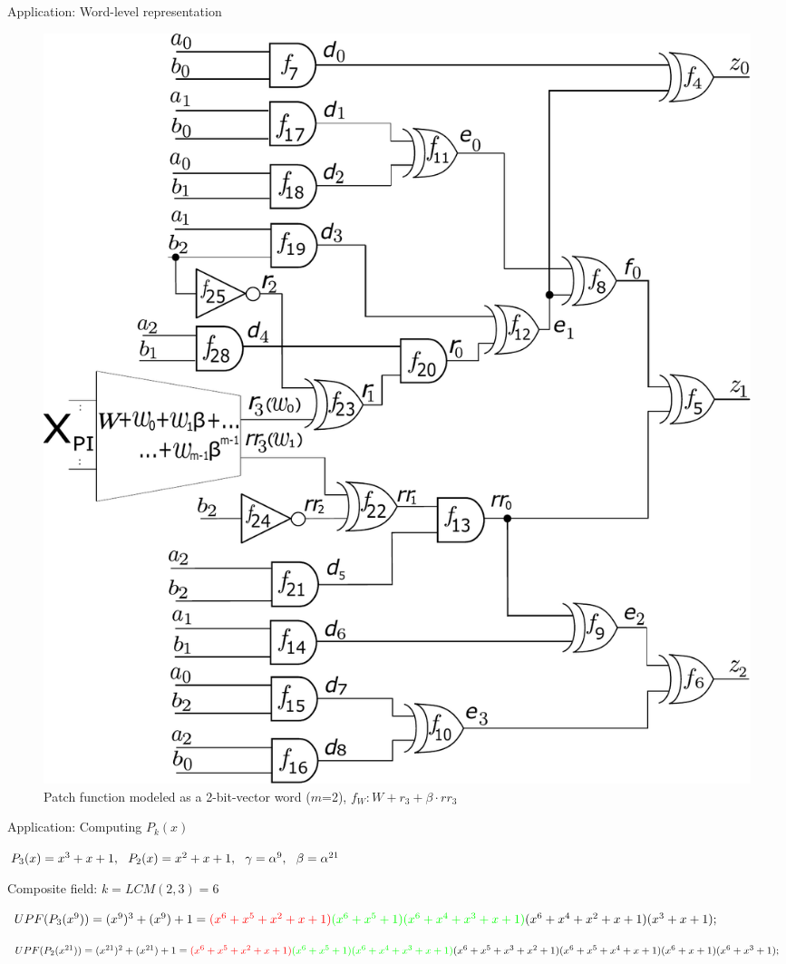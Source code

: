 \begin{frame}{\large Application: Word-level representation}
\begin{figure}[hbt]
\centering
    \includegraphics[scale = 0.24]{mas_3_ddc_mfr_b.pdf}
    \caption*{
    Patch function modeled as a 2-bit-vector word ($m$=2), 
    $f_W: W+ r_3 + \beta \cdot rr_3$}
\end{figure}
\end{frame}

\begin{frame}{\large Application: Computing $P_k(x)$}
\bi
\item $P_3(x) = x^3+x+1,~~P_2(x) = x^2+x+1,~~\gamma = \alpha^9,~~\beta=\alpha^{21}$
\pause
\vspace{0.1in}
	\item Composite field: $k=LCM(2,3)=6$
	\vspace{0.1in}
	\pause
	\bi
		\item $ UPF(P_3(x^9)) = (x^9)^3+(x^9)+1 =
  \textcolor{red}{(x^6+x^5+x^2+x+1)}\textcolor{green}{(x^6+x^5+1)}\textcolor{green}{(x^6+x^4+x^3+x+1)}(x^6+x^4+x^2+x+1)(x^3+x+1);$
		\vspace{0.1in}
		\pause
		\item $UPF(P_2(x^{21})) = (x^{21})^2+(x^{21})+1 =
  \textcolor{red}{(x^6+x^5+x^2+x+1)}\textcolor{green}{(x^6+x^5+1)}\textcolor{green}{(x^6+x^4+x^3+x+1)}(x^6+x^5+x^3+x^2+1)
  (x^6+x^5+x^4+x+1)(x^6+x+1)(x^6+x^3+1);$
	\ei
\ei
\end{frame}

